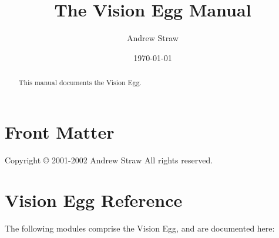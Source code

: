 \documentclass{manual}
\title{The Vision Egg Manual}
\author{Andrew Straw}
\date{\today}			%
\begin{document}
\maketitle

\ifhtml
\chapter*{Front Matter\label{front}}
\fi

Copyright \copyright{} 2001-2002 Andrew Straw
All rights reserved.

\begin{abstract}

\noindent
This manual documents the Vision Egg.
\end{abstract}

\tableofcontents


\chapter{Vision Egg Reference \label{visionegg-modules}}

The following modules comprise the Vision Egg, and are documented
here:


%
%
%
%
%
%
%
%
%
%

\renewcommand{\indexname}{Module Index}

\renewcommand{\indexname}{Index}
\end{document}
